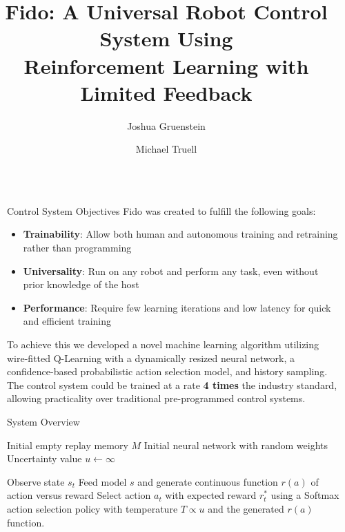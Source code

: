 \documentclass[final]{beamer}
\title{Fido: A Universal Robot Control System Using\\Reinforcement Learning with Limited Feedback}
\author{\LARGE Joshua Gruenstein \and Michael Truell}
\institute{\mbox{}}
\newlength{\sepwid}
\newlength{\onecolwid}
\begin{document}
\setlength{\belowcaptionskip}{2ex}
\setlength\belowdisplayshortskip{2ex}

\begin{frame}[t]
\begin{columns}[t]

\begin{column}{\sepwid}\end{column}
\begin{column}{\onecolwid}

	\begin{alertblock}{Control System Objectives}
		Fido was created to fulfill the following goals:
		\begin{itemize}
			\item \textbf{Trainability}: Allow both human and autonomous training and retraining rather than programming
			\item \textbf{Universality}: Run on any robot and perform any task, even without prior knowledge of the host
			\item \textbf{Performance}: Require few learning iterations and low latency for quick and efficient training
		\end{itemize}
		To achieve this we developed a novel machine learning algorithm utilizing wire-fitted Q-Learning with a dynamically resized neural network, a confidence-based probabilistic action selection model, and history sampling.  The control system could be trained at a rate \textbf{4 times} the industry standard, allowing practicality over traditional pre-programmed control systems.
	\end{alertblock}

	\begin{block}{System Overview}
		\begin{algorithm}[H]
		\caption*{\textbf{Fido Control System Algorithm}}\label{euclid}
		\small
		\begin{algorithmic}[1]
			\State Initial empty replay memory $M$
			\State Initial neural network with random weights
			\State Uncertainty value $u \gets \infty$

			  \State Observe state $s_t$
			  \State Feed model $s$ and generate continuous function $r(a)$ of action versus reward
			  \State Select action $a_t$ with expected reward $r_t^*$ using a Softmax action selection policy with temperature $T \propto u$ and the generated $r(a)$ function.


\end{algorithmic}
\end{algorithm}
\end{block}
\end{column}
\end{columns}
\end{frame}
\end{document}
